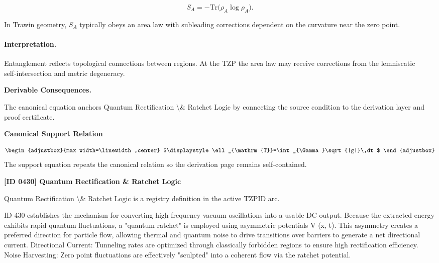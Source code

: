 \begin{equation}
S_A = -\mathrm{Tr}\big( \rho_A\log\rho_A \big).
\end{equation}

In Trawin geometry, $S_A$ typically obeys an area law with subleading corrections dependent on the curvature near the zero point.

\paragraph{Interpretation.}

Entanglement reflects topological connections between regions.  At the TZP the area law may receive corrections from the lemniscatic self‑intersection and metric degeneracy.

\par\vspace{0.35em}
\noindent\textbf{Derivable Consequences.}\quad
\begingroup
\footnotesize
\raggedright
The canonical equation anchors Quantum Rectification \textbackslash{}\& Ratchet Logic by connecting the source condition to the derivation layer and proof certificate.
\par\endgroup

\noindent\textbf{Canonical Support Relation}\par
\[
\begin{adjustbox}{max width=\linewidth,center}
$\displaystyle
\ell_{\mathrm{T}}=\int_{\Gamma}\sqrt{|g|}\,dt
$
\end{adjustbox}
\]
\noindent The support equation repeats the canonical relation so the derivation page remains self-contained.\par

\clearpage
\noindent\textbf{[ID 0430] Quantum Rectification \& Ratchet Logic}\par
\vspace{0.35em}
\begingroup\small
{}
Quantum Rectification \textbackslash{}\& Ratchet Logic is a registry definition in the active TZPID arc.

ID 430 establishes the mechanism for converting high frequency vacuum oscillations into a usable DC output. Because the extracted energy exhibits rapid quantum fluctuations, a "quantum ratchet" is employed using asymmetric potentials V (x, t). This asymmetry creates a preferred direction for particle flow, allowing thermal and quantum noise to drive transitions over barriers to generate a net directional current. Directional Current: Tunneling rates are optimized through classically forbidden regions to ensure high rectification efficiency. Noise Harvesting: Zero point fluctuations are effectively "sculpted" into a coherent flow via the ratchet potential.

